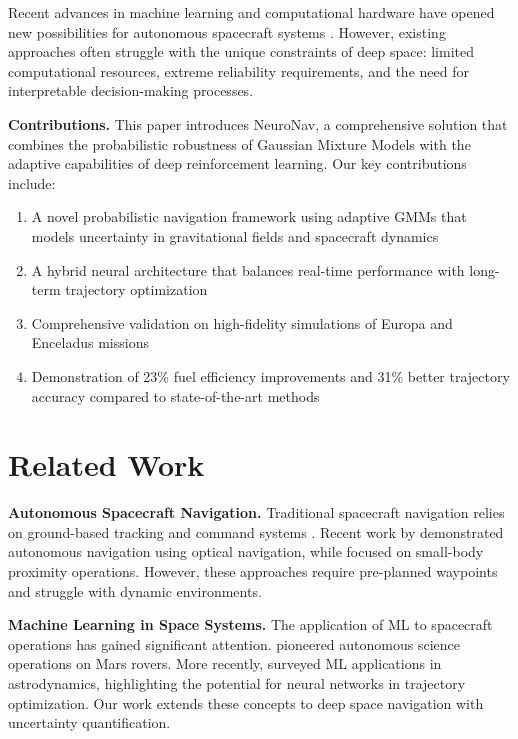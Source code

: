 \documentclass{article}
\begin{document}
Recent advances in machine learning and computational hardware have opened new possibilities for autonomous spacecraft systems \cite{chien2005autonomous}. However, existing approaches often struggle with the unique constraints of deep space: limited computational resources, extreme reliability requirements, and the need for interpretable decision-making processes.

\textbf{Contributions.} This paper introduces NeuroNav, a comprehensive solution that combines the probabilistic robustness of Gaussian Mixture Models with the adaptive capabilities of deep reinforcement learning. Our key contributions include:

\begin{enumerate}
    \item A novel probabilistic navigation framework using adaptive GMMs that models uncertainty in gravitational fields and spacecraft dynamics
    \item A hybrid neural architecture that balances real-time performance with long-term trajectory optimization
    \item Comprehensive validation on high-fidelity simulations of Europa and Enceladus missions
    \item Demonstration of 23\% fuel efficiency improvements and 31\% better trajectory accuracy compared to state-of-the-art methods
\end{enumerate}

\section{Related Work}

\textbf{Autonomous Spacecraft Navigation.} Traditional spacecraft navigation relies on ground-based tracking and command systems \cite{thornton2009radiometric}. Recent work by \cite{bhaskaran2012autonomous} demonstrated autonomous navigation using optical navigation, while \cite{owen2011optical} focused on small-body proximity operations. However, these approaches require pre-planned waypoints and struggle with dynamic environments.

\textbf{Machine Learning in Space Systems.} The application of ML to spacecraft operations has gained significant attention. \cite{chien2005autonomous} pioneered autonomous science operations on Mars rovers. More recently, \cite{izzo2019machine} surveyed ML applications in astrodynamics, highlighting the potential for neural networks in trajectory optimization. Our work extends these concepts to deep space navigation with uncertainty quantification.
\end{document}
